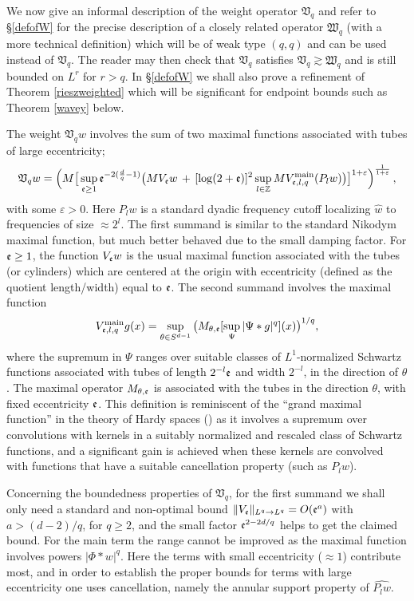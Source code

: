 \documentclass[11pt]{amsart}
\theoremstyle{definition}
\numberwithin{theorem}{section}
\numberwithin{definition}{section}
\def\ecc{\frak e}
\def\gc{\gtrsim}
\def\eps{\varepsilon}
\def\fV{{\mathfrak {V}}}
\def\fW{{\mathfrak {W}}}
\def\bbZ{{\mathbb {Z}}}
\begin{document}
We now give an informal description of the weight operator $\fV_q$
 and refer to \S\ref{defofW}
for the  precise
description of a closely related  operator $\fW_q$
(with a more technical definition)
which  will be of weak
type $(q,q)$ and  can
be used instead of
$\fV_q$. The reader may then check that $\fV_q$ satisfies
$\fV_{q}\gc \fW_{q}$ and is still bounded on $L^{r}$ for $r>q$.
In \S\ref{defofW}  we
shall also  prove  a  refinement of Theorem \ref{rieszweighted}
which will be significant for  endpoint bounds
such as Theorem \ref{wavey} below.

 The weight
$\fV_qw$ involves the sum of two maximal functions associated with
tubes of large eccentricity;
$$ \fV_q w=
\Big(M \big[\sup_{\ecc\ge 1} {\ecc}^{-2(\frac dq-1)} \big(M
V_{\ecc}w \, +\, [\log(2+\ecc)]^{2} \sup_{l\in \bbZ} M
V^{\text{main}}_{\ecc,l,q}(P_lw)\big)\big]^{1+\eps}\Big)^{\frac{1}{1+\eps}}\,,$$
with some $\eps>0$.
Here  $P_l w$ is a standard dyadic frequency cutoff localizing
$\widehat w$ to frequencies of size $\approx 2^l$. The first summand
is similar to the  standard Nikodym maximal function, but much
better behaved due to the small damping factor. For $\ecc\ge 1$, the
function $V_{\ecc} w$ is the usual maximal function  associated with
the tubes (or cylinders) which are centered at the origin with
eccentricity (defined as the quotient  length/width) equal to
$\ecc$. The second summand involves the
 maximal function
$$V_{\ecc,l,q}^{\text{main}}g(x)=
 \sup_{\theta\in S^{d-1}}\big(M_{\theta,\ecc}[\sup_{\Psi}
|\Psi* g|^q](x)\big)^{1/q},$$ where the supremum in
 $\Psi$ ranges over  suitable classes of  $L^1$-normalized Schwartz functions associated with
tubes  of length $2^{-l}\ecc$ and width $2^{-l}$, in the direction
of $\theta$. The maximal operator $M_{\theta,\ecc}$ is associated
with the tubes in the direction $\theta$, with fixed eccentricity
$\ecc$.
This  definition is reminiscent of the
``grand maximal function'' in the theory of Hardy spaces
(\cite{fest}) as it involves  a supremum over convolutions with kernels
in a suitably normalized and rescaled
class of Schwartz functions, and a significant  gain is achieved when these kernels
are convolved with functions that have a suitable cancellation
property  (such as $P_l w$).

Concerning the boundedness properties of  $\fV_q$, for the first summand
 we shall
only  need a standard and non-optimal  bound $\|V_\ecc\|_{L^q\to
L^q}=O(\ecc^{a})$ with $a>(d-2)/q$, for $q\ge 2$, and the small
factor $\ecc^{2-2d/q}$ helps to get   the claimed bound. For the
main term the range cannot be improved
 as the maximal function involves powers $|\Phi*w|^q$. Here  the
terms with small  eccentricity ($\approx 1$)  contribute most, and  in order to establish the proper bounds for terms with
large eccentricity  one uses cancellation, namely the  annular support property
of $\widehat {P_lw}$.
\end{document}

